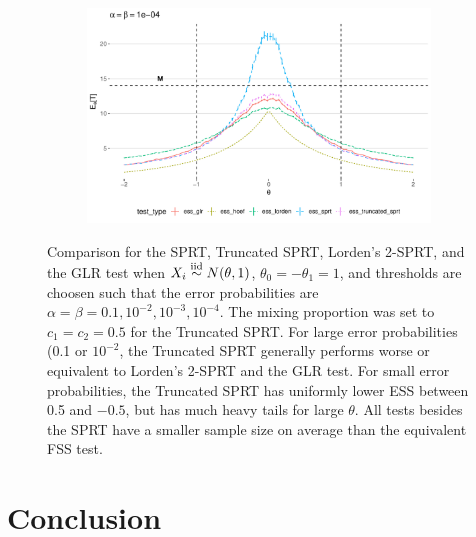 \documentclass[11pt]{article}
\begin{document}
\begin{figure}
\begin{subfigure}{0.49\textwidth}
\end{subfigure}
\hfill
\begin{subfigure}{0.49\textwidth}
    \includegraphics[width=\textwidth]{images/ess_alpha1e4}
\end{subfigure}

\caption{Comparison for the SPRT, Truncated SPRT, Lorden's 2-SPRT, and the GLR test when $X_i \overset{\text{iid}}\sim N(\theta, 1)$, $\theta_0 = -\theta_1 = 1$, and thresholds are choosen such that the error probabilities are $\alpha = \beta = 0.1, 10^{-2}, 10^{-3}, 10^{-4}$. The mixing proportion was set to $c_1 = c_2 = 0.5$ for the Truncated SPRT. For large error probabilities (0.1 or $10^{-2}$, the Truncated SPRT generally performs worse or equivalent to Lorden's 2-SPRT and the GLR test. For small error probabilities, the Truncated SPRT has uniformly lower ESS between 0.5 and $-0.5$, but has much heavy tails for large $\theta$. All tests besides the SPRT have a smaller sample size on average than the equivalent FSS test.}
\end{figure}

\section{Conclusion}

\newpage


\end{document}
